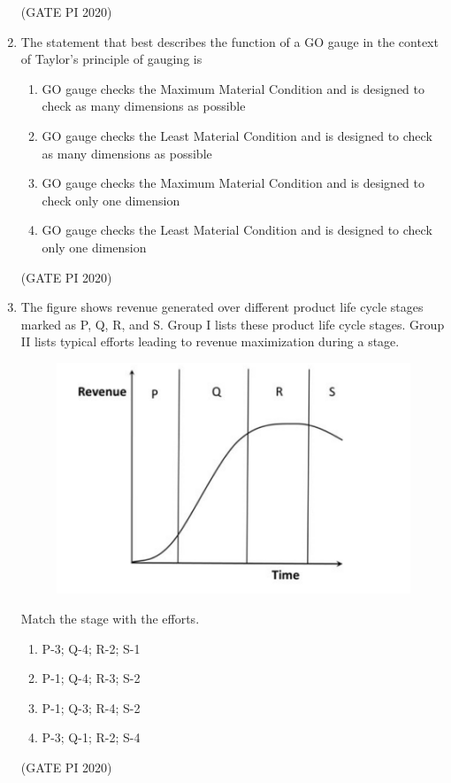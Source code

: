 \documentclass[journal,12pt,onecolumn]{IEEEtran}
\theoremstyle{remark}
\begin{document}
\begin{enumerate}
\hfill (GATE PI 2020)

\item The statement that best describes the function of a GO gauge in the context of Taylor's principle of gauging is
\begin{enumerate}
    \item GO gauge checks the Maximum Material Condition and is designed to check as many dimensions as possible
    \item GO gauge checks the Least Material Condition and is designed to check as many dimensions as possible
    \item GO gauge checks the Maximum Material Condition and is designed to check only one dimension
    \item GO gauge checks the Least Material Condition and is designed to check only one dimension
\end{enumerate}

\hfill (GATE PI 2020)

\item The figure shows revenue generated over different product life cycle stages marked as P, Q, R, and S. Group I lists these product life cycle stages. Group II lists typical efforts leading to revenue maximization during a stage.

\begin{figure}[h]
    \centering
    \includegraphics[width=0.5\columnwidth]{figs/fig13.png}
    \caption{}
    \label{fig:placeholder}
\end{figure}



Match the stage with the efforts.
\begin{enumerate}
    \item P-3; Q-4; R-2; S-1
    \item P-1; Q-4; R-3; S-2
    \item P-1; Q-3; R-4; S-2
    \item P-3; Q-1; R-2; S-4
\end{enumerate}

\hfill (GATE PI 2020)


\end{enumerate}
\end{document}
